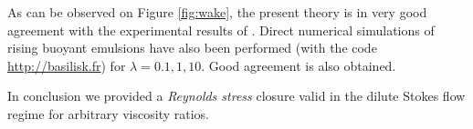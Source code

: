 \documentclass[a4paper,11pt]{article}
\theoremstyle{mytheoremstyle}
\theoremstyle{mytheoremstyle}
\theoremstyle{myproblemstyle}
\begin{document}
As can be observed on Figure \ref{fig:wake}, the present theory is in very good agreement with the experimental results of \cite{cartellier2009induced}.  
Direct numerical simulations of rising buoyant emulsions have also been performed (with the code \url{http://basilisk.fr}) for $\lambda = 0.1,1,10$. Good agreement is also obtained. 

In conclusion we provided a \textit{Reynolds stress} closure valid in the dilute Stokes flow regime for arbitrary viscosity ratios. 


\end{document}

